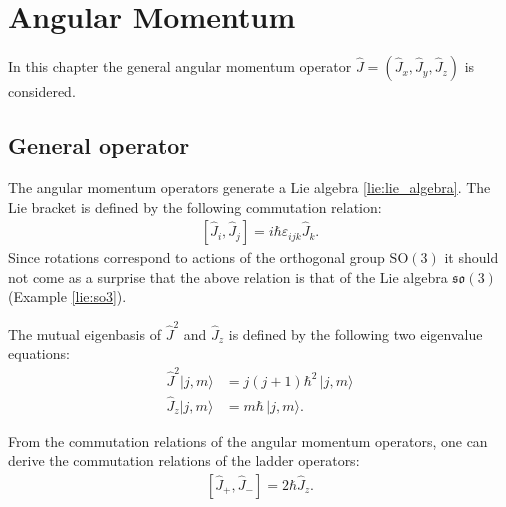\chapter{Angular Momentum}

    In this chapter the general angular momentum operator $\hat{J} = \left(\hat{J}_x,\hat{J}_y,\hat{J}_z\right)$ is considered.

\section{General operator}

    \begin{property}
       The angular momentum operators generate a Lie algebra \ref{lie:lie_algebra}. The Lie bracket is defined by the following commutation relation:
       \begin{gather}
           \label{angular_momentum:commutation}
           \left[\hat{J}_i,\hat{J}_j\right] = i\hbar\varepsilon_{ijk}\hat{J}_k.
       \end{gather}
       Since rotations correspond to actions of the orthogonal group $\mathrm{SO}(3)$ it should not come as a surprise that the above relation is that of the Lie algebra $\mathfrak{so}(3)$ (Example \ref{lie:so3}).
    \end{property}

    \begin{property}
       The mutual eigenbasis of $\hat{J}^2$ and $\hat{J}_z$ is defined by the following two eigenvalue equations:
       \begin{align}
           \label{angular_momentum:j}
           \hat{J}^2|j,m\rangle &= j(j+1)\hbar^2\,|j,m\rangle\\
           \label{angular_momentum:m}
           \hat{J}_z|j,m\rangle &= m\hbar\,|j,m\rangle.
        \end{align}
    \end{property}

    \begin{result}
        From the commutation relations of the angular momentum operators, one can derive the commutation relations of the ladder operators:
        \begin{gather}
            \left[\hat{J}_+,\hat{J}_-\right] = 2\hbar\hat{J}_z.
        \end{gather}
    \end{result}

